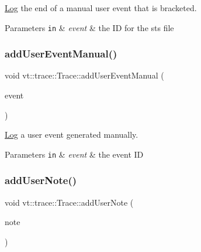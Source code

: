 \hyperlink{structvt_1_1trace_1_1_log}{Log} the end of a manual user event that is bracketed. 


\begin{DoxyParams}[1]{Parameters}
\mbox{\tt in}  & {\em event} & the ID for the sts file \\
\hline
\end{DoxyParams}
\mbox{\label{structvt_1_1trace_1_1_trace_a2d9fac6bd71ba67e4f87b7efd7c6c6c7}} 
\subsubsection{\texorpdfstring{add\+User\+Event\+Manual()}{addUserEventManual()}}
{\footnotesize\ttfamily void vt\+::trace\+::\+Trace\+::add\+User\+Event\+Manual (\begin{DoxyParamCaption}\item[{\hyperlink{namespacevt_1_1trace_a70c43e0e1596eea236912d4197d3120a}{User\+Spec\+Event\+I\+D\+Type}}]{event }\end{DoxyParamCaption})}



\hyperlink{structvt_1_1trace_1_1_log}{Log} a user event generated manually. 


\begin{DoxyParams}[1]{Parameters}
\mbox{\tt in}  & {\em event} & the event ID \\
\hline
\end{DoxyParams}
\mbox{\label{structvt_1_1trace_1_1_trace_a8be5309a84a6d0f99df0eb835fedf3b1}} 
\subsubsection{\texorpdfstring{add\+User\+Note()}{addUserNote()}}
{\footnotesize\ttfamily void vt\+::trace\+::\+Trace\+::add\+User\+Note (\begin{DoxyParamCaption}\item[{std\+::string const \&}]{note }\end{DoxyParamCaption})}



